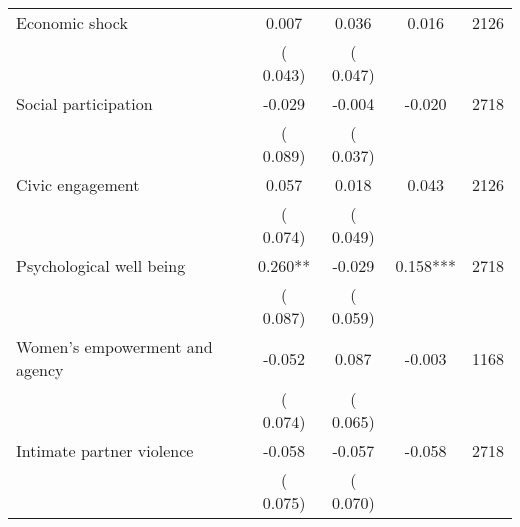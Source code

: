 \begin{tabular}{l*{4}{c}}
 Economic shock                       &              0.007 &         0.036            &              0.016     & 2126                             \\  
                                       &          (       0.043)               &        (       0.047)                                &                                               &                                               \\      

 Social participation                       &             -0.029 &        -0.004            &             -0.020     & 2718                             \\  
                                       &          (       0.089)               &        (       0.037)                                &                                               &                                               \\      

 Civic engagement                       &              0.057 &         0.018            &              0.043     & 2126                             \\  
                                       &          (       0.074)               &        (       0.049)                                &                                               &                                               \\      

 Psychological well being                       &              0.260** &        -0.029            &              0.158***     & 2718                             \\  
                                       &          (       0.087)               &        (       0.059)                                &                                               &                                               \\      

 Women's empowerment and agency                       &             -0.052 &         0.087            &             -0.003     & 1168                             \\  
                                       &          (       0.074)               &        (       0.065)                                &                                               &                                               \\      

 Intimate partner violence                       &             -0.058 &        -0.057            &             -0.058     & 2718                             \\  
                                       &          (       0.075)               &        (       0.070)                                &                                               &                                               \\      


\end{tabular}
